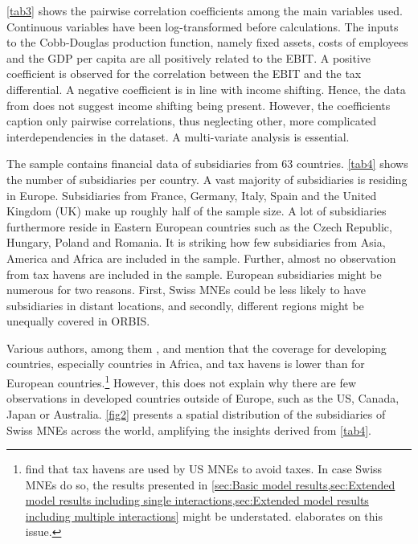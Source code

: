 \documentclass[10pt,twocolumn,oneside,cmyk]{article}
\begin{document}
\cref{tab3} shows the pairwise correlation coefficients among the main variables used. Continuous variables have been log-transformed before calculations. The inputs to the Cobb-Douglas production function, namely fixed assets, costs of employees and the GDP per capita are all positively related to the EBIT. A positive coefficient is observed for the correlation between the EBIT and the tax differential. A negative coefficient is in line with income shifting. Hence, the data from  does not suggest income shifting being present. However, the coefficients caption only pairwise correlations, thus neglecting other, more complicated interdependencies in the dataset. A multi-variate analysis is essential.

The sample contains financial data of subsidiaries from 63 countries. \cref{tab4} shows the number of subsidiaries per country. A vast majority of subsidiaries is residing in Europe. Subsidiaries from France, Germany, Italy, Spain and the United Kingdom (UK) make up roughly half of the sample size. A lot of subsidiaries furthermore reside in Eastern European countries such as the Czech Republic, Hungary, Poland and Romania. It is striking how few subsidiaries from Asia, America and Africa are included in the sample. Further, almost no observation from tax havens are included in the sample. European subsidiaries might be numerous for two reasons. First, Swiss MNEs could be less likely to have subsidiaries in distant locations, and secondly, different regions might be unequally covered in ORBIS. 

Various authors, among them \textcite[14]{cobham_international_2014}, \textcite[908]{clausing_effect_2016} and \textcite[18]{fuest_tax_2010} mention that the coverage for developing countries, especially countries in Africa, and tax havens is lower than for European countries.\footnote{\textcite[529-530]{desai_demand_2006} find that tax havens are used by US MNEs to avoid taxes. In case Swiss MNEs do so, the results presented in \cref{sec:Basic model results,sec:Extended model results including single interactions,sec:Extended model results including multiple interactions} might be understated.  elaborates on this issue.} However, this does not explain why there are few observations in developed countries outside of Europe, such as the US, Canada, Japan or Australia. \cref{fig2} presents a spatial distribution of the subsidiaries of Swiss MNEs across the world, amplifying the insights derived from \cref{tab4}.
\end{document}
